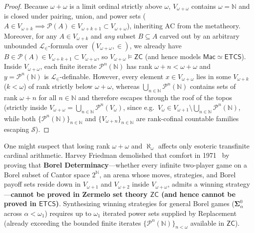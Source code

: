 \begin{proof}
Because $\omega + \omega$ is a limit ordinal strictly above $\omega$, $V_{\omega+\omega}$ contains $\omega = \mathbb{N}$ and is closed under pairing, union, and power sets ($A \in V_{\omega+k} \implies \mathcal{P}(A) \in V_{\omega+k+1} \subset V_{\omega+\omega}$), inheriting $\mathrm{AC}$ from the metatheory. Moreover, for any $A \in V_{\omega+k}$ and \emph{any} subset $B \subseteq A$ carved out by an arbitrary unbounded $\mathcal{L}_\in$-formula over $(V_{\omega+\omega}, \in)$, we already have $B \in \mathcal{P}(A) \in V_{\omega+k+1} \subset V_{\omega+\omega}$, so $V_{\omega+\omega} \models \mathsf{ZC}$ (and hence models $\mathsf{Mac} \simeq \mathsf{ETCS}$). Inside $V_{\omega+\omega}$, each finite iterate $\mathcal{P}^n(\mathbb{N})$ has rank $\omega + n < \omega + \omega$ and $y = \mathcal{P}^n(\mathbb{N})$ is $\mathcal{L}_\in$-definable. However, every element $x \in V_{\omega+\omega}$ lies in some $V_{\omega+k}$ ($k < \omega$) of rank strictly below $\omega + \omega$, whereas $\bigcup_{n \in \mathbb{N}} \mathcal{P}^n(\mathbb{N})$ contains sets of rank $\omega + n$ for all $n \in \mathbb{N}$ and therefore escapes through the roof of the topos (strictly inside $V_{\omega+\omega} = \bigcup_{n \in \mathbb{N}} \mathcal{P}^n(V_\omega)$, since e.g.\ $V_\omega \in V_{\omega+1} \setminus \bigcup_{n \in \mathbb{N}} \mathcal{P}^n(\mathbb{N})$, while both $\{\mathcal{P}^n(\mathbb{N})\}_{n \in \mathbb{N}}$ and $\{V_{\omega+n}\}_{n \in \mathbb{N}}$ are rank-cofinal countable families escaping $\mathcal{S}$).
\end{proof}

One might suspect that losing rank $\omega + \omega$ and $\aleph_\omega$ affects only esoteric transfinite cardinal arithmetic. Harvey Friedman demolished that comfort in 1971~\cite{Friedman71} by proving that \textbf{Borel Determinacy}---whether every infinite two-player game on a Borel subset of Cantor space $2^{\mathbb{N}}$, an arena whose moves, strategies, and Borel payoff sets reside down in $V_{\omega+1}$ and $V_{\omega+2}$ inside $V_{\omega+\omega}$, admits a winning strategy---\textbf{cannot be proved in Zermelo set theory $\mathsf{ZC}$ (and hence cannot be proved in $\mathsf{ETCS}$)}. Synthesizing winning strategies for general Borel games ($\boldsymbol{\Sigma}^0_\alpha$ across $\alpha < \omega_1$) requires up to $\omega_1$ iterated power sets supplied by Replacement (already exceeding the bounded finite iterates $\{\mathcal{P}^n(\mathbb{N})\}_{n < \omega}$ available in $\mathsf{ZC}$).

